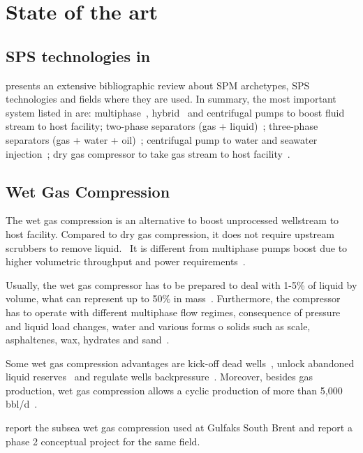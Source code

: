 \section{State of the art}
\label{sec:StateOfArt}
\subsection{SPS technologies in \Floco}
\citet{Oathkeeper2017} presents an extensive bibliographic review about SPM \Floco archetypes, SPS technologies and fields where they are used. In summary, the most important system listed in \citet{Oathkeeper2017} are: multiphase~\citep{Hua2012}, hybrid~\citep{Solvik2013} and centrifugal pumps to boost fluid stream to host facility; two-phase separators (gas + liquid)~\citep{Jahnsen2011}; three-phase separators (gas + water + oil)~\citep{Jahnsen2011}; centrifugal pump to water and seawater injection~\citep{Marjohan2014}; dry gas compressor to take gas stream to host facility~\citep{Storstenvik2016}. 

\subsection{Wet Gas Compression}
The wet gas compression is an alternative to boost unprocessed wellstream to host facility. Compared to dry gas compression, it does not require upstream scrubbers to remove liquid.~\citep{Storstenvik2016} It is different from  multiphase pumps boost due to higher volumetric throughput and power requirements~\citep{Boe2018}.

Usually, the wet gas compressor has to be prepared to deal with  1-5\% of liquid by volume, what can represent up to 50\% in mass~\citep{Boe2018}. Furthermore, the compressor has to operate with different multiphase flow regimes, consequence of pressure and liquid load changes, water and various forms o solids such as scale, asphaltenes, wax, hydrates and sand~\citep{Boe2018}.

Some wet gas compression advantages are kick-off dead wells~\citep{Boe2018}, unlock abandoned liquid reserves~\citep{Floisand2019} and regulate wells backpressure~\citep{Boe2018, Floisand2019}. Moreover, besides gas production, wet gas compression allows a cyclic production of more than 5,000 bbl/d~\citep{Floisand2019}. 

\citet{SubseaSurvey2018} report the subsea wet gas compression used at Gulfaks South Brent and \citet{SubseaSurvey2020} report a phase 2 conceptual project for the same field.

